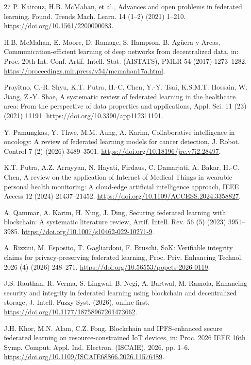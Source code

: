 \begin{thebibliography}{27}
 P. Kairouz, H.B. McMahan, et al., Advances and open problems in federated learning, Found. Trends Mach. Learn. 14 (1--2) (2021) 1--210. \url{https://doi.org/10.1561/2200000083}.

 H.B. McMahan, E. Moore, D. Ramage, S. Hampson, B. Ag\"uera y Arcas, Communication-efficient learning of deep networks from decentralized data, in: Proc. 20th Int. Conf. Artif. Intell. Stat. (AISTATS), PMLR 54 (2017) 1273--1282. \url{https://proceedings.mlr.press/v54/mcmahan17a.html}.

 Prayitno, C.-R. Shyu, K.T. Putra, H.-C. Chen, Y.-Y. Tsai, K.S.M.T. Hossain, W. Jiang, Z.-Y. Shae, A systematic review of federated learning in the healthcare area: From the perspective of data properties and applications, Appl. Sci. 11 (23) (2021) 11191. \url{https://doi.org/10.3390/app112311191}.

 Y. Pamungkas, Y. Thwe, M.M. Aung, A. Karim, Collaborative intelligence in oncology: A review of federated learning models for cancer detection, J. Robot. Control 7 (2) (2026) 3489--3501. \url{https://doi.org/10.18196/jrc.v7i2.28497}.

 K.T. Putra, A.Z. Arrayyan, N. Hayati, Firdaus, C. Damarjati, A. Bakar, H.-C. Chen, A review on the application of Internet of Medical Things in wearable personal health monitoring: A cloud-edge artificial intelligence approach, IEEE Access 12 (2024) 21437--21452. \url{https://doi.org/10.1109/ACCESS.2024.3358827}.

 A. Qammar, A. Karim, H. Ning, J. Ding, Securing federated learning with blockchain: A systematic literature review, Artif. Intell. Rev. 56 (5) (2023) 3951--3985. \url{https://doi.org/10.1007/s10462-022-10271-9}.

 A. Rizzini, M. Esposito, T. Gagliardoni, F. Bruschi, SoK: Verifiable integrity claims for privacy-preserving federated learning, Proc. Priv. Enhancing Technol. 2026 (4) (2026) 248--271. \url{https://doi.org/10.56553/popets-2026-0119}.

 J.S. Rauthan, R. Verma, S. Lingwal, B. Negi, A. Bartwal, M. Ramola, Enhancing security and integrity in federated learning using blockchain and decentralized storage, J. Intell. Fuzzy Syst. (2026), online first. \url{https://doi.org/10.1177/18758967261473662}.

 J.H. Khor, M.N. Alam, C.Z. Fong, Blockchain and IPFS-enhanced secure federated learning on resource-constrained IoT devices, in: Proc. 2026 IEEE 16th Symp. Comput. Appl. Ind. Electron. (ISCAIE), 2026, pp. 1--6. \url{https://doi.org/10.1109/ISCAIE68866.2026.11576489}.


\end{thebibliography}
